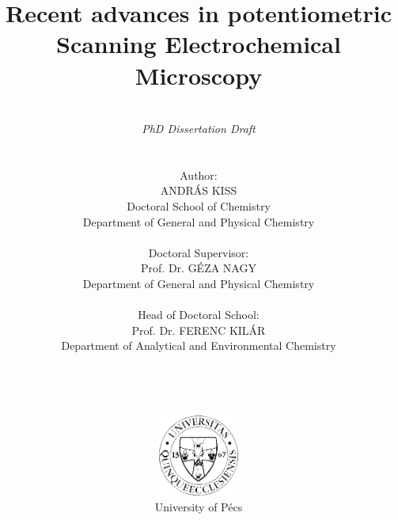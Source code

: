 \pagestyle{empty}

\title{\textbf{Recent advances in potentiometric Scanning Electrochemical Microscopy}}

\author{\\ \emph{PhD Dissertation Draft} \\ \\ \\ Author: \\ ANDRÁS KISS \\ Doctoral School of Chemistry \\ Department of General and Physical Chemistry \\ \\ Doctoral Supervisor: \\ Prof. Dr. GÉZA NAGY
\\ Department of General and Physical Chemistry \\
\\ Head of Doctoral School: \\
Prof. Dr. FERENC KILÁR\\
Department of Analytical and Environmental Chemistry \\
\\ \\ \\ \\
\includegraphics[width=0.2\textwidth]{img/pte_logo.eps} \\
University of Pécs}
\maketitle

\thispagestyle{empty}
\large
\setcounter{tocdepth}{4}
\tableofcontents
\newpage
\thispagestyle{empty}
\thispagestyle{empty}
